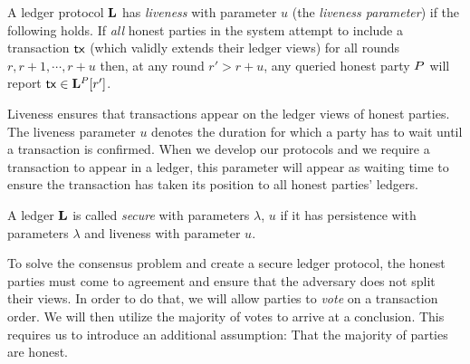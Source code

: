 \begin{definition}[Liveness]
  A ledger protocol $\mathbf{L}$ has \emph{liveness} with parameter $u$ (the
  \emph{liveness parameter}) if the following holds.
  If \emph{all} honest parties in the system attempt to include a transaction
  $\mathsf{tx}$ (which validly extends their ledger views) for all rounds $r, r + 1, \cdots, r
  + u$ then, at any round $r' > r + u$, any queried honest party $P$ will
  report $\mathsf{tx} \in \mathbf{L}^{P}[r']$.
\end{definition}

Liveness ensures that transactions appear on the ledger views of honest parties.
The liveness parameter $u$ denotes the duration for which a party has to wait
until a transaction is confirmed. When we develop our protocols and we require
a transaction to appear in a ledger, this parameter will appear as waiting time
to ensure the transaction has taken its position to all honest parties' ledgers.

\begin{definition}
  A ledger $\mathbf{L}$ is called \emph{secure} with parameters $\lambda$, $u$ if
  it has persistence with parameters $\lambda$ and liveness with parameter $u$.
\end{definition}

To solve the consensus problem and create a secure ledger protocol, the honest
parties must come to agreement and ensure that the adversary does not split
their views. In order to do that, we will allow parties to \emph{vote} on a
transaction order. We will then utilize the majority of votes to arrive at a
conclusion. This requires us to introduce an additional assumption: That the
majority of parties are honest.
